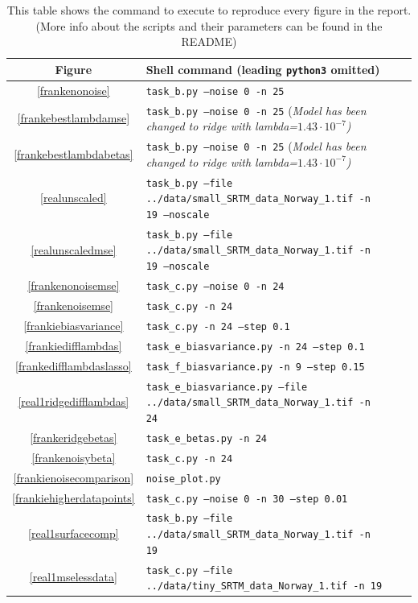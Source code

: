 \documentclass[twocolumn,10pt,cleanfoot]{asme2ej}
\begin{document}
\begin{table}
\caption{This table shows the command to execute to reproduce every figure in the report. (More info about the scripts and their parameters can be found in the README)}
\begin{center}
\label{allparamstable}
\begin{tabular}{c | l l l}
Figure & Shell command (leading \texttt{python3} omitted) \\
\hline
\ref{frankenonoise} & \texttt{task\_b.py --noise 0 -n 25}\\
\ref{frankebestlambdamse} & \texttt{task\_b.py --noise 0 -n 25} \footnotesize{(\it Model has been changed to ridge with lambda=$1.43 \cdot 10^{-7}$)}\\
\ref{frankebestlambdabetas} & \texttt{task\_b.py --noise 0 -n 25} \footnotesize{(\it Model has been changed to ridge with lambda=$1.43 \cdot 10^{-7}$)}\\
\ref{realunscaled} & \texttt{task\_b.py --file ../data/small\_SRTM\_data\_Norway\_1.tif -n 19 --noscale}\\
\ref{realunscaledmse} & \texttt{task\_b.py --file ../data/small\_SRTM\_data\_Norway\_1.tif -n 19 --noscale}\\
\ref{frankenonoisemse} & \texttt{task\_c.py --noise 0 -n 24}\\
\ref{frankenoisemse} & \texttt{task\_c.py -n 24}\\
\ref{frankiebiasvariance} & \texttt{task\_c.py -n 24 --step 0.1}\\
\ref{frankiedifflambdas} & \texttt{task\_e\_biasvariance.py -n 24 --step 0.1}\\
\ref{frankedifflambdaslasso} & \texttt{task\_f\_biasvariance.py -n 9 --step 0.15}\\
\ref{real1ridgedifflambdas} & \texttt{task\_e\_biasvariance.py --file ../data/small\_SRTM\_data\_Norway\_1.tif -n 24}\\
\ref{frankeridgebetas} & \texttt{task\_e\_betas.py -n 24}\\
\ref{frankenoisybeta} & \texttt{task\_c.py -n 24}\\
\ref{frankienoisecomparison} & \texttt{noise\_plot.py}\\
\ref{frankiehigherdatapoints} & \texttt{task\_c.py --noise 0 -n 30 --step 0.01}\\
\ref{real1surfacecomp} & \texttt{task\_b.py --file ../data/small\_SRTM\_data\_Norway\_1.tif -n 19}\\
\ref{real1mselessdata} & \texttt{task\_c.py --file ../data/tiny\_SRTM\_data\_Norway\_1.tif -n 19}\\

\end{tabular}
\end{center}
\end{table}
\end{document}

